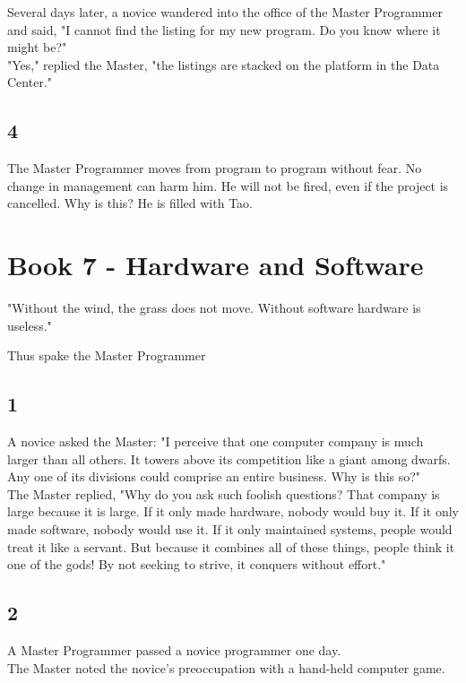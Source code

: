 \documentclass[14pt, letterpaper]{book}
\begin{document}
Several days later, a novice wandered into the office of the Master Programmer and said, "I cannot find the listing for my new program. Do you know where it might be?"\\

"Yes," replied the Master, "the listings are stacked on the platform in the Data Center."\\

\section*{4}
The Master Programmer moves from program to program without fear. No change in management can harm him. He will not be fired, even if the project is cancelled. Why is this? He is filled with Tao.

\chapter*{Book 7 - Hardware and Software}
\epigraph{"Without the wind, the grass does not move. Without software hardware is useless."}{Thus spake the Master Programmer}

\section*{1}
A novice asked the Master: "I perceive that one computer company is much larger than all others. It towers above its competition like a giant among dwarfs. Any one of its divisions could comprise an entire business. Why is this so?"\\

The Master replied, "Why do you ask such foolish questions? That company is large because it is large. If it only made hardware, nobody would buy it. If it only made software, nobody would use it. If it only maintained systems, people would treat it like a servant. But because it combines all of these things, people think it one of the gods! By not seeking to strive, it conquers without effort."

\section*{2}
A Master Programmer passed a novice programmer one day.\\

The Master noted the novice's preoccupation with a hand-held computer game.\\
\end{document}
